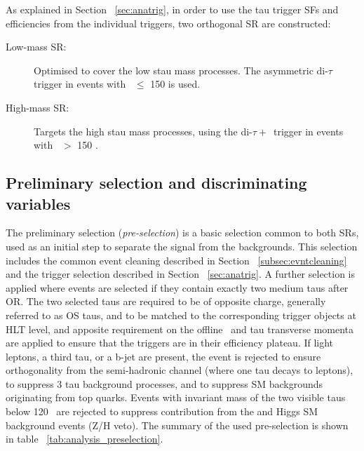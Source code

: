 	As explained in Section ~\ref{sec:anatrig}, in order to use the tau trigger \ac{SF}s and efficiencies from the individual triggers, two orthogonal \ac{SR} are constructed:
	\begin{description}
	
	\item[Low-mass SR:] Optimised to cover the low stau mass processes. The asymmetric di-$\tau$ trigger in events with \met\ $\leq$ 150 \gev is used.
	\item[High-mass SR:] Targets the high stau mass processes, using the di-$\tau+$\met\ trigger in events with \met\ $>$ 150 \gev.
	\end{description}	 
	\subsection*{Preliminary selection and discriminating variables}
	The preliminary selection (\textit{pre-selection}) is a basic selection common to both \ac{SR}s, used as an initial step to separate the signal from the backgrounds. 
	This selection includes the common event cleaning described in Section ~\ref{subsec:evntcleaning} and the trigger selection described in Section ~\ref{sec:anatrig}. 
	A further selection is applied where events are selected if they contain exactly two medium taus after \ac{OR}. 
	The two selected taus are required to be of opposite charge, generally referred to as \ac{OS} taus, and to be matched to the corresponding trigger objects at \ac{HLT} level, and apposite requirement on the offline \met\ and tau transverse momenta are applied to ensure that the triggers are in their efficiency plateau. 
	If light leptons, a third tau, or a b-jet are present, the event is rejected to ensure orthogonality from the semi-hadronic channel (where one tau decays to leptons), to suppress 3 tau background processes, and to suppress \ac{SM} backgrounds originating from top quarks.
	Events with invariant mass of the two visible taus below 120 \gev\ are rejected to suppress contribution from the \Zjets and Higgs \ac{SM} background events (Z/H veto). The summary of the used pre-selection is shown in table ~\ref{tab:analysis_preselection}.
	
